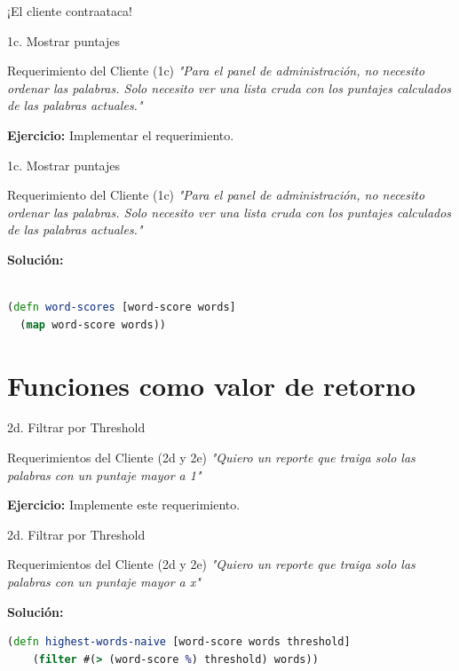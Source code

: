 \documentclass{beamer}
\begin{document}
\begin{emptyframe}
    ¡El cliente contraataca!
\end{emptyframe}

\begin{frame}[fragile]{1c. Mostrar puntajes}
    \begin{exampleblock}{Requerimiento del Cliente (1c)}
        \textit{"Para el panel de administración, no necesito ordenar las palabras. Solo necesito ver una lista cruda con los puntajes calculados de las palabras actuales."}
    \end{exampleblock}

    \textbf{Ejercicio:} Implementar el requerimiento.
\end{frame}

\begin{frame}[fragile]{1c. Mostrar puntajes}
    \begin{exampleblock}{Requerimiento del Cliente (1c)}
        \textit{"Para el panel de administración, no necesito ordenar las palabras. Solo necesito ver una lista cruda con los puntajes calculados de las palabras actuales."}
    \end{exampleblock}

    \textbf{Solución:}
    
    \begin{lstlisting}[language=Clojure]

(defn word-scores [word-score words] 
  (map word-score words))
    \end{lstlisting}
\end{frame}

\section{Funciones como valor de retorno}

\begin{frame}[fragile]{2d. Filtrar por Threshold }
    \begin{exampleblock}{Requerimientos del Cliente (2d y 2e)}
        \textit{"Quiero un reporte que traiga solo las palabras con un puntaje mayor a 1"}
    \end{exampleblock}

    \textbf{Ejercicio:} Implemente este requerimiento.
\end{frame}


\begin{frame}[fragile]{2d. Filtrar por Threshold }
    \begin{exampleblock}{Requerimientos del Cliente (2d y 2e)}
        \textit{"Quiero un reporte que traiga solo las palabras con un puntaje mayor a x"}
    \end{exampleblock}

    \textbf{Solución:}
    
    \begin{lstlisting}[language=Clojure]
(defn highest-words-naive [word-score words threshold]
    (filter #(> (word-score %) threshold) words))
    \end{lstlisting}
\end{frame}
\end{document}
